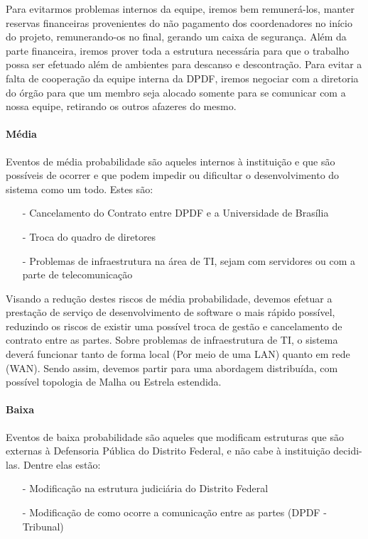\documentclass[12pt,a4paper]{report}
\begin{document}
Para evitarmos problemas internos da equipe, iremos bem remunerá-los, manter reservas financeiras provenientes do não pagamento dos coordenadores no início do projeto, remunerando-os no final, gerando um caixa de segurança. Além da parte financeira, iremos prover toda a estrutura necessária para que o trabalho possa ser efetuado além de ambientes para descanso e descontração. Para evitar a falta de cooperação da equipe interna da DPDF, iremos negociar com a diretoria do órgão para que um membro seja alocado somente para se comunicar com a nossa equipe, retirando os outros afazeres do mesmo.

\paragraph{Média} Eventos de média probabilidade são aqueles internos à instituição e que são possíveis de ocorrer e que podem impedir ou dificultar o desenvolvimento do sistema como um todo. Estes são:
\begin{itemize}
\item [-] Cancelamento do Contrato entre DPDF e a Universidade de Brasília
\item [-] Troca do quadro de diretores
\item [-] Problemas de infraestrutura na área de TI, sejam com servidores ou com a parte de telecomunicação
\end{itemize}

Visando a redução destes riscos de média probabilidade, devemos efetuar a prestação de serviço de desenvolvimento de software o mais rápido possível, reduzindo os riscos de existir uma possível troca de gestão e cancelamento de contrato entre as partes.
Sobre problemas de infraestrutura de TI, o sistema deverá funcionar tanto de forma local (Por meio de uma LAN) quanto em rede (WAN). Sendo assim, devemos partir para uma abordagem distribuída, com possível topologia de Malha ou Estrela estendida.

\paragraph{Baixa} Eventos de baixa probabilidade são aqueles que modificam estruturas que são externas à Defensoria Pública do Distrito Federal, e não cabe à instituição decidi-las. Dentre elas estão:
\begin{itemize}
\item [-] Modificação na estrutura judiciária do Distrito Federal
\item [-] Modificação de como ocorre a comunicação entre as partes (DPDF - Tribunal)
\end{itemize}
\end{document}
